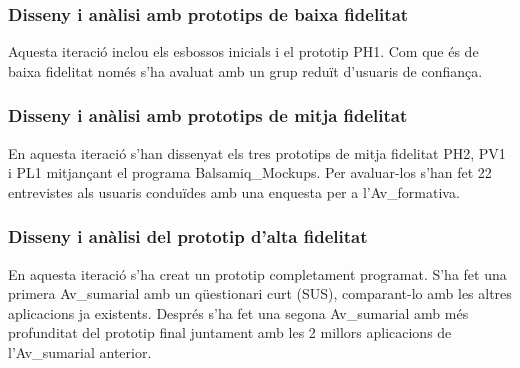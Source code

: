 \subsubsection{Disseny i anàlisi amb prototips de baixa fidelitat}
Aquesta iteració inclou els esbossos inicials i el prototip PH1. Com que és de baixa fidelitat només s'ha avaluat amb un grup reduït d'usuaris de confiança.
\subsubsection{Disseny i anàlisi amb prototips de mitja fidelitat}
En aquesta iteració s'han dissenyat els tres prototips de mitja fidelitat PH2, PV1 i PL1 mitjançant el programa \gls{Balsamiq_Mockups}. Per avaluar-los s'han fet 22 entrevistes als usuaris conduïdes amb una enquesta per a l'\gls{Av_formativa}.
\subsubsection{Disseny i anàlisi del prototip d'alta fidelitat}
En aquesta iteració s'ha creat un prototip completament programat. S'ha fet una primera \gls{Av_sumarial} amb un qüestionari curt (SUS), comparant-lo amb les altres aplicacions ja existents. Després s'ha fet una segona \gls{Av_sumarial} amb més profunditat del prototip final juntament amb les 2 millors aplicacions de l'\gls{Av_sumarial} anterior. 
